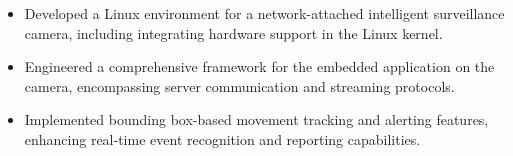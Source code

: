 \begin{minipage}{\linewidth}
\begin{itemize}
  \item Developed a Linux environment for a network-attached intelligent surveillance camera, including integrating hardware support in the Linux kernel.
  \item Engineered a comprehensive framework for the embedded application on the camera, encompassing server communication and streaming protocols.
  \item Implemented bounding box-based movement tracking and alerting features, enhancing real-time event recognition and reporting capabilities.
\end{itemize}
\end{minipage}
\divider
